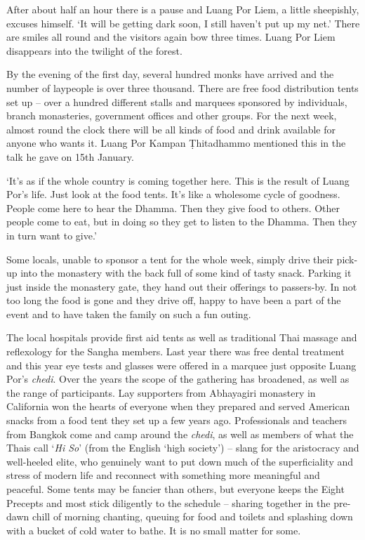 After about half an hour there is a pause and Luang Por Liem, a little
sheepishly, excuses himself. `It will be getting dark soon, I still
haven't put up my net.' There are smiles all round and the visitors
again bow three times. Luang Por Liem disappears into the twilight of
the forest. 

By the evening of the first day, several hundred monks have arrived and
the number of laypeople is over three thousand. There are free food
distribution tents set up -- over a hundred different stalls and
marquees sponsored by individuals, branch monasteries, government
offices and other groups. For the next week, almost round the clock
there will be all kinds of food and drink available for anyone who wants
it. Luang Por Kampan Ṭhitadhammo mentioned this in the talk he gave on
15th January. 

`It's as if the whole country is coming together here. This is the
result of Luang Por's life. Just look at the food tents. It's like a
wholesome cycle of goodness. People come here to hear the Dhamma. Then
they give food to others. Other people come to eat, but in doing so they
get to listen to the Dhamma. Then they in turn want to give.'

Some locals, unable to sponsor a tent for the whole week, simply drive
their pick-up into the monastery with the back full of some kind of
tasty snack. Parking it just inside the monastery gate, they hand out
their offerings to passers-by. In not too long the food is gone and they
drive off, happy to have been a part of the event and to have taken the
family on such a fun outing. 

The local hospitals provide first aid tents as well as traditional Thai
massage and reflexology for the Sangha members. Last year there was free
dental treatment and this year eye tests and glasses were offered in a
marquee just opposite Luang Por's \emph{chedi}. Over the years the scope
of the gathering has broadened, as well as the range of participants. 
Lay supporters from Abhayagiri monastery in California won the hearts of
everyone when they prepared and served American snacks from a food tent
they set up a few years ago. Professionals and teachers from Bangkok
come and camp around the \emph{chedi}, as well as members of what the
Thais call `\emph{Hi So}' (from the English `high society') -- slang for
the aristocracy and well-heeled elite, who genuinely want to put down
much of the superficiality and stress of modern life and reconnect with
something more meaningful and peaceful. Some tents may be fancier than
others, but everyone keeps the Eight Precepts and most stick diligently
to the schedule -- sharing together in the pre-dawn chill of morning
chanting, queuing for food and toilets and splashing down with a bucket
of cold water to bathe. It is no small matter for some. 


